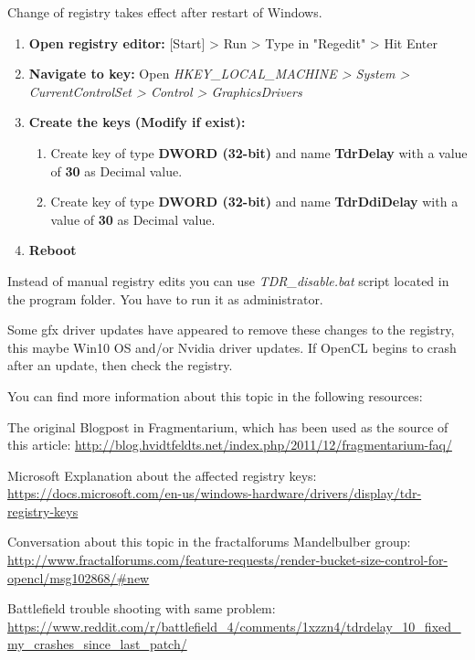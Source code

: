 Change of registry takes effect after restart of Windows.

\begin{enumerate}
	
	\item \textbf{Open registry editor:} [Start] > Run > Type in "Regedit" > Hit Enter
	\item \textbf{Navigate to key:} Open \emph{HKEY\_LOCAL\_MACHINE > System > CurrentControlSet > Control > GraphicsDrivers}
	\item \textbf{Create the keys (Modify if exist):}
	\begin{enumerate}
		\item Create key of type \textbf{DWORD (32-bit)} and name \textbf{TdrDelay} with a value of \textbf{30} as Decimal value.
		\item Create key of type \textbf{DWORD (32-bit)} and name \textbf{TdrDdiDelay} with a value of \textbf{30} as Decimal value.	
	\end{enumerate}	
	\item \textbf{Reboot}

\end{enumerate}

Instead of manual registry edits you can use \emph{TDR\_disable.bat} script located in the program folder. You have to run it as administrator.

Some gfx driver updates have appeared to remove these changes to the registry, this maybe Win10 OS and/or Nvidia driver updates. If OpenCL begins to crash after an update, then check the registry.

You can find more information about this topic in the following resources:

The original Blogpost in Fragmentarium, which has been used as the source of this article: \url{http://blog.hvidtfeldts.net/index.php/2011/12/fragmentarium-faq/}

Microsoft Explanation about the affected registry keys: \url{https://docs.microsoft.com/en-us/windows-hardware/drivers/display/tdr-registry-keys}

Conversation about this topic in the fractalforums Mandelbulber group:
\url{http://www.fractalforums.com/feature-requests/render-bucket-size-control-for-opencl/msg102868/#new}

Battlefield trouble shooting with same problem:
\url{https://www.reddit.com/r/battlefield_4/comments/1xzzn4/tdrdelay_10_fixed_my_crashes_since_last_patch/}

%
% 
 
 
